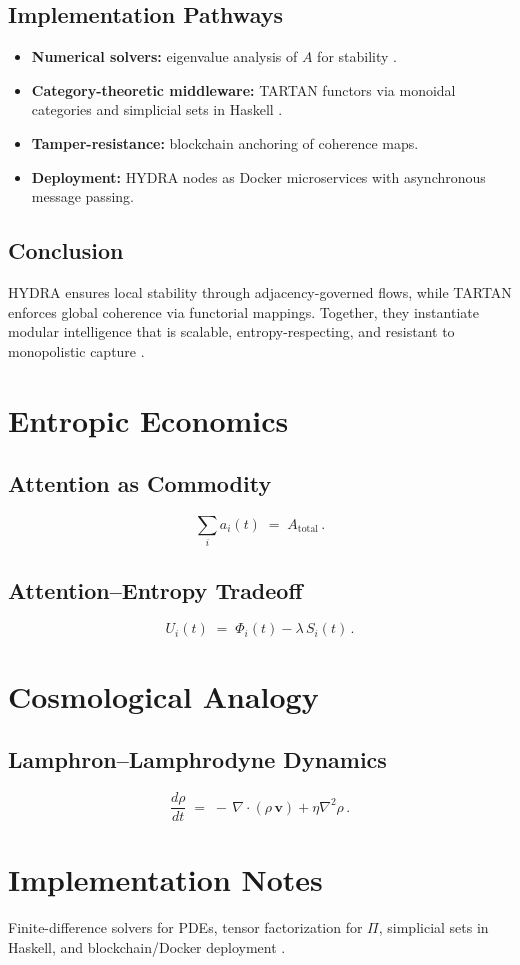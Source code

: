 \documentclass[12pt]{article}
\begin{document}
\subsection*{Implementation Pathways}
\begin{itemize}[leftmargin=1.2em]
  \item \textbf{Numerical solvers:} eigenvalue analysis of \(A\) for stability \citep{bird1988}.
  \item \textbf{Category-theoretic middleware:} TARTAN functors via monoidal categories and simplicial sets in Haskell \citep{milewski2018}.
  \item \textbf{Tamper-resistance:} blockchain anchoring of coherence maps.
  \item \textbf{Deployment:} HYDRA nodes as Docker microservices with asynchronous message passing.
\end{itemize}

\subsection*{Conclusion}
HYDRA ensures local stability through adjacency-governed flows, while TARTAN enforces global coherence via functorial mappings. Together, they instantiate modular intelligence that is scalable, entropy-respecting, and resistant to monopolistic capture \citep{whitehead1978}.

\section*{Entropic Economics}
\subsection*{Attention as Commodity}
\[
\sum_i a_i(t) \;=\; A_{\text{total}} \, .
\]
\citep{shannon1948}

\subsection*{Attention–Entropy Tradeoff}
\[
U_i(t) \;=\; \Phi_i(t) - \lambda\, S_i(t) \, .
\]
\citep{hanson2003}

\section*{Cosmological Analogy}
\subsection*{Lamphron–Lamphrodyne Dynamics}
\[
\frac{d\rho}{dt} \;=\; -\,\nabla \cdot (\rho\,\mathbf{v}) + \eta \nabla^2 \rho \, .
\]
\citep{whitehead1978}

\section*{Implementation Notes}
Finite-difference solvers for PDEs, tensor factorization for \(\Pi\), simplicial sets in Haskell, and blockchain/Docker deployment \citep{bird1988, milewski2018}.




\end{document}

